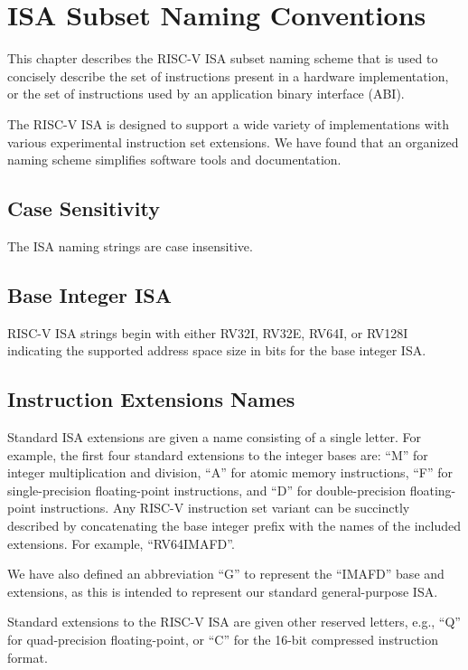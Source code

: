 \chapter{ISA Subset Naming Conventions}
\label{naming}

This chapter describes the RISC-V ISA subset naming scheme that is
used to concisely describe the set of instructions present in a
hardware implementation, or the set of instructions used by an
application binary interface (ABI).

\begin{commentary}
The RISC-V ISA is designed to support a wide variety of
implementations with various experimental instruction set extensions.
We have found that an organized naming scheme simplifies software
tools and documentation.
\end{commentary}

\section{Case Sensitivity}

The ISA naming strings are case insensitive.

\section{Base Integer ISA}
RISC-V ISA strings begin with either RV32I, RV32E, RV64I, or RV128I
indicating the supported address space size in bits for the base
integer ISA.

\section{Instruction Extensions Names}

Standard ISA extensions are given a name consisting of a single
letter.  For example, the first four standard
extensions to the integer bases are:
``M'' for integer multiplication and division,
``A'' for atomic memory instructions,
``F'' for single-precision floating-point instructions, and
``D'' for double-precision floating-point instructions.
Any RISC-V instruction set variant can be succinctly described by
concatenating the base integer prefix with the names of the included
extensions.  For example, ``RV64IMAFD''.

We have also defined an abbreviation ``G'' to represent the ``IMAFD''
base and extensions, as this is intended to represent our standard
general-purpose ISA.

Standard extensions to the RISC-V ISA are given other reserved
letters, e.g., ``Q'' for quad-precision floating-point, or
``C'' for the 16-bit compressed instruction format.

